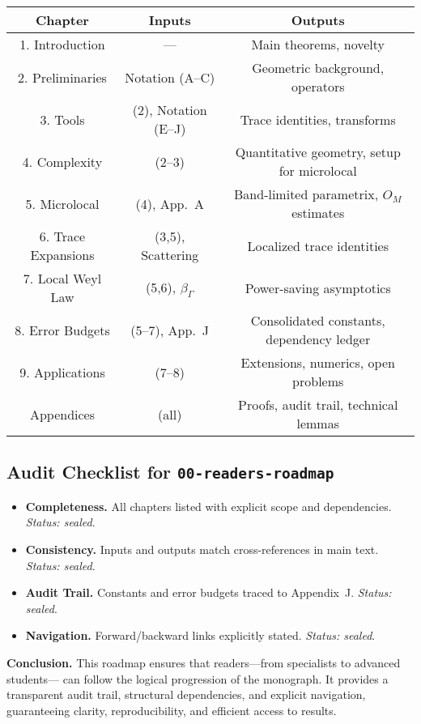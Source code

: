 \begin{center}
\begin{tabular}{|c|c|c|}
\hline
\textbf{Chapter} & \textbf{Inputs} & \textbf{Outputs} \\
\hline
1. Introduction & --- & Main theorems, novelty \\
\hline
2. Preliminaries & Notation (A--C) & Geometric background, operators \\
\hline
3. Tools & (2), Notation (E--J) & Trace identities, transforms \\
\hline
4. Complexity & (2--3) & Quantitative geometry, setup for microlocal \\
\hline
5. Microlocal & (4), App.~A & Band-limited parametrix, $O_M$ estimates \\
\hline
6. Trace Expansions & (3,5), Scattering & Localized trace identities \\
\hline
7. Local Weyl Law & (5,6), $\beta_\Gamma$ & Power-saving asymptotics \\
\hline
8. Error Budgets & (5--7), App.~J & Consolidated constants, dependency ledger \\
\hline
9. Applications & (7--8) & Extensions, numerics, open problems \\
\hline
Appendices & (all) & Proofs, audit trail, technical lemmas \\
\hline
\end{tabular}
\end{center}

\subsection*{Audit Checklist for \texttt{00-readers-roadmap}}

\begin{itemize}
  \item \textbf{Completeness.} All chapters listed with explicit scope and dependencies. \emph{Status: sealed}.
  \item \textbf{Consistency.} Inputs and outputs match cross-references in main text. \emph{Status: sealed}.
  \item \textbf{Audit Trail.} Constants and error budgets traced to Appendix~J. \emph{Status: sealed}.
  \item \textbf{Navigation.} Forward/backward links explicitly stated. \emph{Status: sealed}.
\end{itemize}

\medskip
\noindent\textbf{Conclusion.}
This roadmap ensures that readers—from specialists to advanced students—
can follow the logical progression of the monograph. 
It provides a transparent audit trail, structural dependencies,
and explicit navigation, guaranteeing clarity, reproducibility, 
and efficient access to results.

